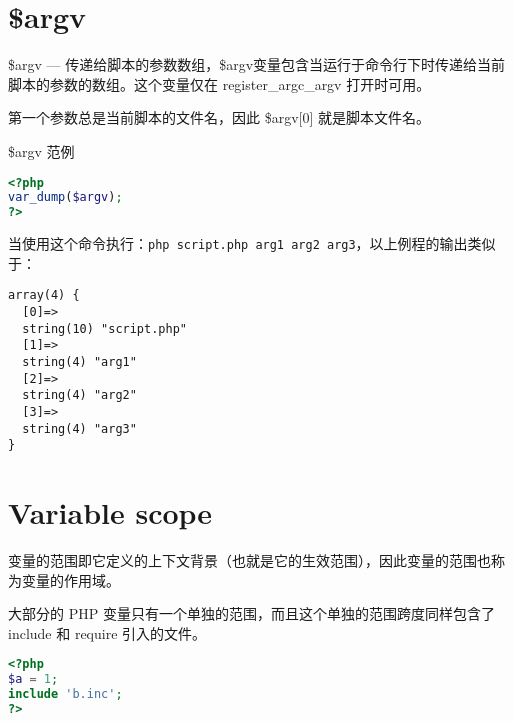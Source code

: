 \begin{example}

\begin{lstlisting}[language=PHP]

\end{lstlisting}
\end{example}

\begin{example}

\begin{lstlisting}[language=PHP]

\end{lstlisting}
\end{example}



\section{\$argv}

\$argv — 传递给脚本的参数数组，\$argv变量包含当运行于命令行下时传递给当前脚本的参数的数组。这个变量仅在 register\_argc\_argv 打开时可用。

第一个参数总是当前脚本的文件名，因此 \$argv[0] 就是脚本文件名。


\begin{example}
\$argv 范例
\begin{lstlisting}[language=PHP]
<?php
var_dump($argv);
?>
\end{lstlisting}
\end{example}

当使用这个命令执行：\verb|php script.php arg1 arg2 arg3|，以上例程的输出类似于：

\begin{verbatim}
array(4) {
  [0]=>
  string(10) "script.php"
  [1]=>
  string(4) "arg1"
  [2]=>
  string(4) "arg2"
  [3]=>
  string(4) "arg3"
}
\end{verbatim}

\section{Variable scope}


变量的范围即它定义的上下文背景（也就是它的生效范围），因此变量的范围也称为变量的作用域。

大部分的 PHP 变量只有一个单独的范围，而且这个单独的范围跨度同样包含了 include 和 require 引入的文件。


\begin{lstlisting}[language=PHP]
<?php
$a = 1;
include 'b.inc';
?>
\end{lstlisting}

